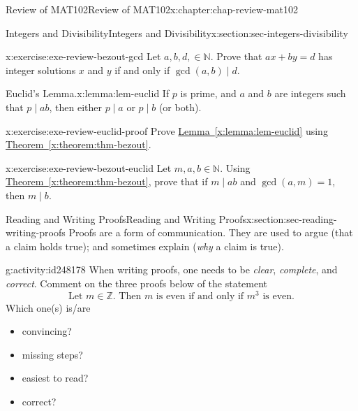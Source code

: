 \documentclass[oneside,10pt,]{book}
\newcommand{\xreffont}{\relax}
\numberwithin{equation}{section}
\begin{document}
\begin{chapterptx}{Review of MAT102}{}{Review of MAT102}{}{}{x:chapter:chap-review-mat102}
\begin{sectionptx}{Integers and Divisibility}{}{Integers and Divisibility}{}{}{x:section:sec-integers-divisibility}
\begin{inlineexercise}{}{x:exercise:exe-review-bezout-gcd}
Let \(a, b, d, \in \mathbb{N}\). Prove that \(ax + by = d\) has integer solutions \(x\) and \(y\) if and only if \(\gcd(a,b) \mid d\).%
\end{inlineexercise}
\begin{lemma}{Euclid's Lemma.}{}{x:lemma:lem-euclid}%
If \(p\) is prime, and \(a\) and \(b\) are integers such that \(p \mid ab\), then either \(p \mid a\) or \(p \mid b\) (or both).%
\end{lemma}
\begin{inlineexercise}{}{x:exercise:exe-review-euclid-proof}%
Prove \hyperref[x:lemma:lem-euclid]{Lemma~{\xreffont\ref{x:lemma:lem-euclid}}} using \hyperref[x:theorem:thm-bezout]{Theorem~{\xreffont\ref{x:theorem:thm-bezout}}}.%
\end{inlineexercise}
\begin{inlineexercise}{}{x:exercise:exe-review-bezout-euclid}%
Let \(m,a,b \in \mathbb{N}\). Using \hyperref[x:theorem:thm-bezout]{Theorem~{\xreffont\ref{x:theorem:thm-bezout}}}, prove that if \(m \mid ab\) and \(\gcd(a,m) = 1\), then \(m \mid b\).%
\end{inlineexercise}
\end{sectionptx}
%
%
\typeout{************************************************}
\typeout{************************************************}
%
\begin{sectionptx}{Reading and Writing Proofs}{}{Reading and Writing Proofs}{}{}{x:section:sec-reading-writing-proofs}
Proofs are a form of communication. They are used to argue (that a claim holds true); and sometimes explain (\emph{why} a claim is true).%
\begin{activity}{}{g:activity:id248178}%
When writing proofs, one needs to be \emph{clear}, \emph{complete}, and \emph{correct}. Comment on the three proofs below of the statement%
\begin{equation*}
\text{Let } m \in \mathbb{Z}\text{. Then }m\text{ is even if and only if } m^3 \text{\ is even}\text{.}
\end{equation*}
Which one(s) is\slash{}are%
\begin{multicols}{2}
\begin{itemize}[label=\textbullet]
\item{}convincing?%
\item{}missing steps?%
\item{}easiest to read?%
\item{}correct?%
\end{itemize}
\end{multicols}

\end{activity}
\end{sectionptx}
\end{chapterptx}
\end{document}
